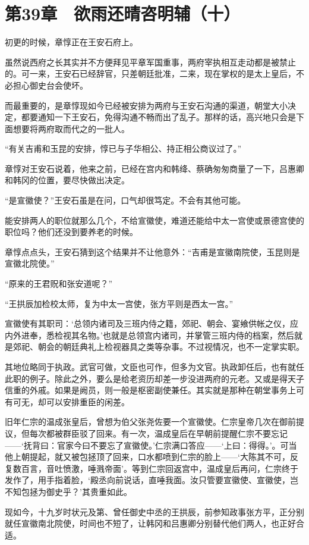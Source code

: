 \section{第39章　欲雨还晴咨明辅（十）}

初更的时候，章惇正在王安石府上。

虽然说西府之长其实并不方便拜见平章军国重事，两府宰执相互走动都是被禁止的。可一来，王安石已经辞官，只差朝廷批准，二来，现在掌权的是太上皇后，不必担心御史台会使坏。

而最重要的，是章惇现如今已经被安排为两府与王安石沟通的渠道，朝堂大小决定，都要通知一下王安石，免得沟通不畅而出了乱子。那样的话，高兴地只会是下面想要将两府取而代之的一批人。

“有关吉甫和玉昆的安排，惇已与子华相公、持正相公商议过了。”

章惇对王安石说着，他来之前，已经在宫内和韩绛、蔡确匆匆商量了一下，吕惠卿和韩冈的位置，要尽快做出决定。

“是宣徽使？”王安石虽是在问，口气却很笃定。不会有其他可能。

能安排两人的职位就那么几个，不给宣徽使，难道还能给中太一宫使或景德宫使的职位吗？他们还没到要养老的时候。

章惇点点头，王安石猜到这个结果并不让他意外：“吉甫是宣徽南院使，玉昆则是宣徽北院使。”

“原来的王君贶和张安道呢？”

“王拱辰加检校太师，复为中太一宫使，张方平则是西太一宫。”

宣徽使有其职司：‘总领内诸司及三班内侍之籍，郊祀、朝会、宴飨供帐之仪，应内外进奉，悉检视其名物。’也就是总领宫内诸司，并掌管三班内侍的档案，然后就是郊祀、朝会的朝廷典礼上检视器具之类等杂事。不过视情况，也不一定掌实职。

其地位略同于执政。武官可做，文臣也可作，但多为文官。执政卸任后，也有就任此职的例子。除此之外，要么是给老资历却差一步没进两府的元老。又或是得天子信重的外戚。如果是阙员，则一般是枢密副使兼任。其实就是那种在朝堂事务上可有可无，却可以安排重臣的闲差。

旧年仁宗的温成张皇后，曾想为伯父张尧佐要一个宣徽使。仁宗皇帝几次在御前提议，但每次都被群臣驳了回来。有一次，温成皇后在早朝前提醒仁宗不要忘记——‘抚背曰：官家今曰不要忘了宣徽使。’仁宗满口答应——‘上曰：得得。’。可当他上朝提起，就又被包拯顶了回来，口水都喷到仁宗的脸上——‘大陈其不可，反复数百言，音吐愤激，唾溅帝面’。等到仁宗回返宫中，温成皇后再问，仁宗终于发作了，用手指着脸，‘殿丞向前说话，直唾我面。汝只管要宣徽使、宣徽使，岂不知包拯为御史乎？’其贵重如此。

现如今，十九岁时状元及第、曾任御史中丞的王拱辰，前参知政事张方平，正分别就任宣徽南北院使，时间也不短了，让韩冈和吕惠卿分别替代他们两人，也正好合适。

